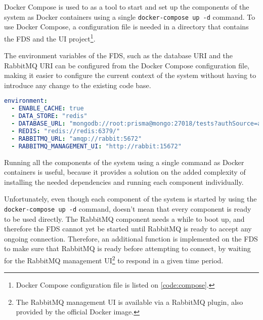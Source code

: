     Docker Compose is used to as a tool to start and set up the components of the system as Docker containers using a single \verb;docker-compose up -d; command. To use Docker Compose, a configuration file is needed in a directory that contains the FDS and the UI project\footnote{Docker Compose configuration file is listed on \autoref{code:compose}.}.
    
    The environment variables of the FDS, such as the database URI and the RabbitMQ URI can be configured from the Docker Compose configuration file, making it easier to configure the current context of the system without having to introduce any change to the existing code base. 
    
    \begin{lstlisting}[caption={Configuring environment variables of FDS (YAML)}, language=yaml]
environment:
  - ENABLE_CACHE: true
  - DATA_STORE: "redis"
  - DATABASE_URL: "mongodb://root:prisma@mongo:27018/tests?authSource=admin/"
  - REDIS: "redis://redis:6379/"
  - RABBITMQ_URL: "amqp://rabbit:5672"
  - RABBITMQ_MANAGEMENT_UI: "http://rabbit:15672"
    \end{lstlisting}
    
    Running all the components of the system using a single command as Docker containers is useful, because it provides a solution on the added complexity of installing the needed dependencies and running each component individually. 

    Unfortunately, even though each component of the system is started by using the \verb;docker-compose up -d; command, doesn't mean that every component is ready to be used directly. The RabbitMQ component needs a while to boot up, and therefore the FDS cannot yet be started until RabbitMQ is ready to accept any ongoing connection. Therefore, an additional function is implemented on the FDS to make sure that RabbitMQ is ready before attempting to connect, by waiting for the RabbitMQ management UI\footnote{The RabbitMQ management UI is available via a RabbitMQ plugin, also provided by the official Docker image.} to respond in a given time period.